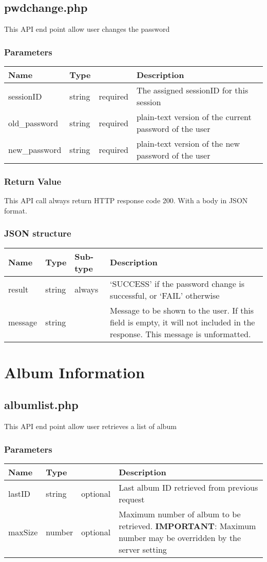 \documentclass[a4paper,12pt]{report}
\begin{document}
	\section{pwdchange.php}
	This API end point allow user changes the password
	\subsection{Parameters}
	\begin{tabular}{|l|ll|p{10cm}|}
		\hline
		Name & Type & & Description\\\hline
		sessionID & string & required & The assigned sessionID for this session\\\hline
		old\_password & string & required & plain-text version of the current password of the user\\\hline
		new\_password & string & required & plain-text version of the new password of the user\\\hline
	\end{tabular}
	\subsection{Return Value}
	This API call always return HTTP response code 200. With a body in JSON format.
	\subsection{JSON structure}
	\begin{tabular}{|l|l|l|p{10cm}|}
		\hline
		Name & Type & Sub-type & Description\\\hline
		result & string & always & 	`SUCCESS' if the password change is successful, or\newline
		`FAIL' otherwise\\\hline
		message & string & & Message to be shown to the user. If this field is empty, it will not included in the response. This message is unformatted.\\\hline
	\end{tabular}
	\chapter{Album Information}
	
	\section{albumlist.php}
	This API end point allow user retrieves a list of album
	\subsection{Parameters}
	\begin{tabular}{|l|ll|p{10cm}|}
		\hline
		Name & Type & & Description\\\hline
		lastID & string & optional & Last album ID retrieved from previous request\\\hline
		maxSize & number & optional & Maximum number of album to be retrieved.\newline
		\textbf{IMPORTANT}: Maximum number may be overridden by the server setting \\\hline
	\end{tabular}
\end{document}
